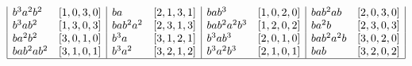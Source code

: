 \begin{example}
\begin{table}[ht]
{\[\begin{array}{|ll|ll|ll|ll|}
				b^3a^2b^2   & [1,0,3,0]      & ba       & [2,1,3,1]      & bab^3       & [1,0,2,0]  & bab^2ab   & [2,0,3,0]  \\
				b^3ab^2     & [1,3,0,3]      & bab^2a^2 & [2,3,1,3]      & bab^2a^2b^3 & [1,2,0,2]  & ba^2b     & [2,3,0,3]  \\
				ba^2b^2     & [3,0,1,0]      & b^3a     & [3,1,2,1]      & b^3ab^3     & [2,0,1,0]  & bab^2a^2b & [3,0,2,0]  \\
				bab^2ab^2   & [3,1,0,1]      & b^3a^2   & [3,2,1,2]      & b^3a^2b^3   & [2,1,0,1]  & bab       & [3,2,0,2] \\ \hline
			\end{array}
			\]
		}
		\label{tab:rank_3_words}
	\end{table}
\end{example}



